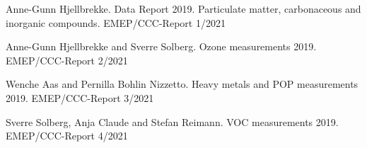 







\enlargethispage{\baselineskip}
\begin{list}{}{\setlength{\leftmargin}{15pt}\setlength{\itemindent}{-\leftmargin}}\small
\item[]
Anne-Gunn Hjellbrekke. 
Data Report 2019. Particulate matter, carbonaceous and inorganic compounds.
EMEP/CCC-Report 1/2021

\item[]
Anne-Gunn Hjellbrekke and Sverre Solberg. 
Ozone measurements 2019. 
EMEP/CCC-Report 2/2021

\item[]
Wenche Aas and Pernilla Bohlin Nizzetto. 
Heavy metals and POP measurements 2019.
EMEP/CCC-Report 3/2021

\item[]
Sverre Solberg, Anja Claude and Stefan Reimann. 
VOC measurements 2019. 
EMEP/CCC-Report 4/2021

\end{list}



